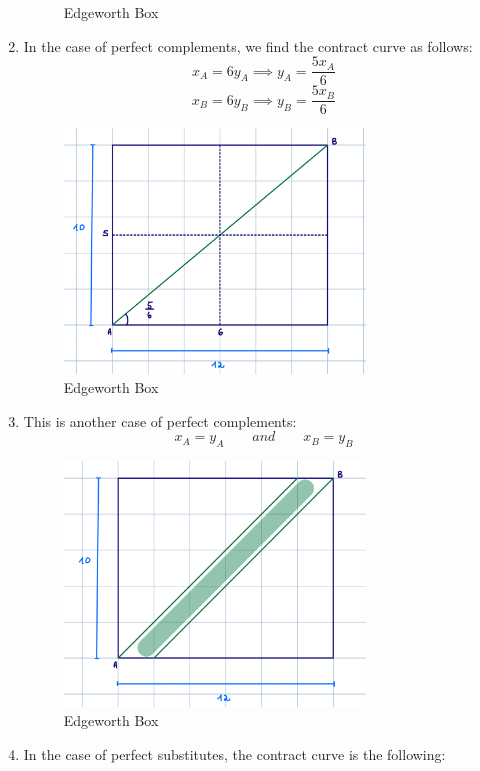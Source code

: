 \documentclass{article}
\begin{document}
\begin{enumerate}[label=(\alph*)]
\begin{figure}[H]
    \caption{Edgeworth Box}
    \label{fig:galaxy}
\end{figure}
\item In the case of perfect complements, we find the contract curve as follows:
\[x_A=6y_A \implies y_A=\frac{5x_A}{6}\]
\[x_B=6y_B \implies y_B=\frac{5x_B}{6}\]
\begin{figure}[H]
    \centering
    \includegraphics[width=8cm]{fig6.png}
    \caption{Edgeworth Box}
    \label{fig:galaxy}
\end{figure}

\item This is another case of perfect complements:
\[x_A=y_A \qquad and \qquad x_B=y_B\]
\begin{figure}[H]
    \centering
    \includegraphics[width=8cm]{fig7.png}
    \caption{Edgeworth Box}
    \label{fig:galaxy}
\end{figure}

\item In the case of perfect substitutes, the contract curve is the following: 


\end{enumerate}
\end{document}
